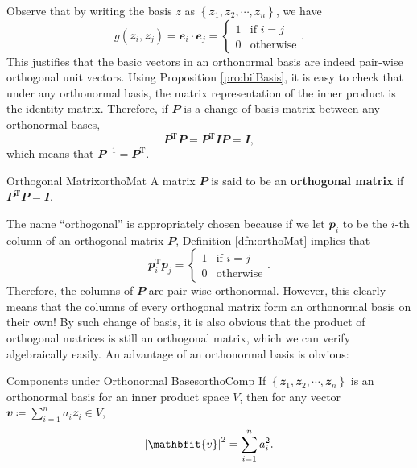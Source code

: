 \documentclass[math]{amznotes}
\theoremstyle{remark}
\newcommand{\I}{\mathbfit{I}}
\begin{document}
    Observe that by writing the basis $z$ as $\left\{\mathbfit{z}_1, \mathbfit{z}_2, \cdots, \mathbfit{z}_n\right\}$, we have 
    \begin{equation*}
        g\left(\mathbfit{z}_i, \mathbfit{z}_j\right) = \mathbfit{e}_i \cdot \mathbfit{e}_j = \begin{cases}
            1 & \textrm{if } i = j \\
            0 & \textrm{otherwise}
        \end{cases}.
    \end{equation*}
    This justifies that the basic vectors in an orthonormal basis are indeed pair-wise orthogonal unit vectors. Using Proposition \ref{pro:bilBasis}, it is easy to check that under any orthonormal basis, the matrix representation of the inner product is the identity matrix. Therefore, if $\mathbfit{P}$ is a change-of-basis matrix between any orthonormal bases,
    \begin{equation*}
        \mathbfit{P}^{\mathrm{T}}\mathbfit{P} = \mathbfit{P}^{\mathrm{T}}\I\mathbfit{P} = \I,
    \end{equation*}
    which means that $\mathbfit{P}^{-1} = \mathbfit{P}^{\mathrm{T}}$.
    \begin{dfnbox}{Orthogonal Matrix}{orthoMat}
        A matrix $\mathbfit{P}$ is said to be an {\color{red} \textbf{orthogonal matrix}} if $\mathbfit{P}^{\mathrm{T}}\mathbfit{P} = \I$.
    \end{dfnbox}
    The name ``orthogonal'' is appropriately chosen because if we let $\mathbfit{p}_i$ to be the $i$-th column of an orthogonal matrix $\mathbfit{P}$, Definition \ref{dfn:orthoMat} implies that 
    \begin{equation*}
        \mathbfit{p}_i^{\mathrm{T}}\mathbfit{p}_j = \begin{cases}
            1 & \textrm{if } i = j \\
            0 & \textrm{otherwise}
        \end{cases}.
    \end{equation*}
    Therefore, the columns of $\mathbfit{P}$ are pair-wise orthonormal. However, this clearly means that the columns of every orthogonal matrix form an orthonormal basis on their own! By such change of basis, it is also obvious that the product of orthogonal matrices is still an orthogonal matrix, which we can verify algebraically easily. An advantage of an orthonormal basis is obvious:
    \begin{probox}{Components under Orthonormal Bases}{orthoComp}
        If $\left\{\mathbfit{z}_1, \mathbfit{z}_2, \cdots, \mathbfit{z}_n\right\}$ is an orthonormal basis for an inner product space $V$, then for any vector $\mathbfit{v} \coloneqq \sum_{i = 1}^{n}a_i\mathbfit{z}_i \in V$, 
        \begin{equation*}
            \abs{\mathbfit{v}}^2 = \sum_{i = 1}^{n}a_i^2.
        \end{equation*}
    \end{probox}
\end{document}
